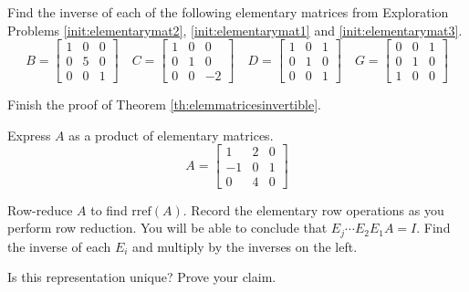 \documentclass{ximera}
\begin{document}
\begin{problem}\label{prob:elem_mat_inv}
Find the inverse of each of the following elementary matrices from Exploration Problems \ref{init:elementarymat2}, \ref{init:elementarymat1} and \ref{init:elementarymat3}.
$$
 B = \begin{bmatrix}  
 1&0&0\\0&5&0\\0&0&1
 \end{bmatrix}\quad
 C = \begin{bmatrix}  
 1&0&0\\0&1&0\\0&0&-2
 \end{bmatrix}
 \quad
 D = \begin{bmatrix}  
 1&0&1\\0&1&0\\0&0&1
 \end{bmatrix}\quad 
 G =  \begin{bmatrix}  
 0&0&1\\0&1&0\\1&0&0
 \end{bmatrix}
 $$
\end{problem}

\begin{problem}
Finish the proof of Theorem \ref{th:elemmatricesinvertible}.
\end{problem}

\begin{problem}
Express $A$ as a product of elementary matrices.
$$A=\begin{bmatrix}1&2&0\\-1&0&1\\0&4&0\end{bmatrix}$$
\begin{hint}
Row-reduce $A$ to find $\mbox{rref}(A)$.  Record the elementary row operations as you perform row reduction.  You will be able to conclude that $E_j\cdots E_2E_1A=I$.  Find the inverse of each $E_i$ and multiply by the inverses on the left.
\end{hint}
Is this representation unique?  Prove your claim.
\end{problem}
\end{document}
